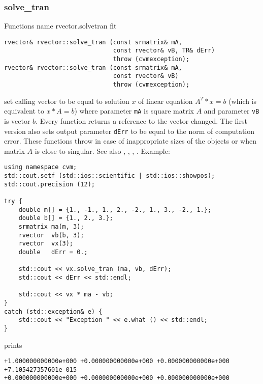 \subsubsection{solve\_tran}
Functions%
\pdfdest name {rvector.solvetran} fit
\begin{verbatim}
rvector& rvector::solve_tran (const srmatrix& mA,
                              const rvector& vB, TR& dErr)
                              throw (cvmexception);
rvector& rvector::solve_tran (const srmatrix& mA,
                              const rvector& vB)
                              throw (cvmexception);
\end{verbatim}
set calling vector to be equal to solution $x$ of linear equation
$A^T*x=b$ (which is equivalent to $x*A=b$) 
where parameter \verb"mA" is  square matrix $A$
and parameter \verb"vB" is  vector $b$.
Every function returns a reference to the vector changed.
The first version also sets output parameter \verb"dErr" to be equal
to the norm of computation error.
These functions throw 
in case of inappropriate sizes
of the objects or when  matrix $A$ is close to singular.
See also , 
, , .
Example:
\begin{Verbatim}
using namespace cvm;
std::cout.setf (std::ios::scientific | std::ios::showpos);
std::cout.precision (12);

try {
    double m[] = {1., -1., 1., 2., -2., 1., 3., -2., 1.};
    double b[] = {1., 2., 3.};
    srmatrix ma(m, 3);
    rvector  vb(b, 3);
    rvector  vx(3);
    double   dErr = 0.;

    std::cout << vx.solve_tran (ma, vb, dErr);
    std::cout << dErr << std::endl;

    std::cout << vx * ma - vb;
}
catch (std::exception& e) {
    std::cout << "Exception " << e.what () << std::endl;
}
\end{Verbatim}
prints
\begin{Verbatim}
+1.000000000000e+000 +0.000000000000e+000 +0.000000000000e+000
+7.105427357601e-015
+0.000000000000e+000 +0.000000000000e+000 +0.000000000000e+000
\end{Verbatim}
\newpage



